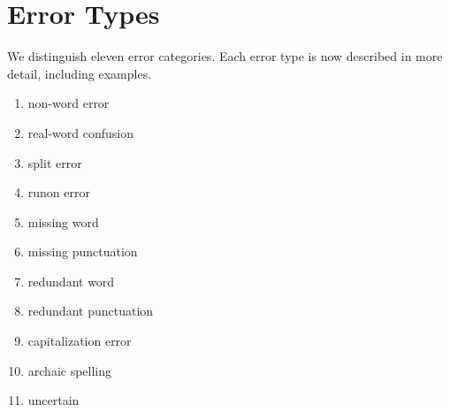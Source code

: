 \documentclass[a4paper,11pt]{article}
\begin{document}


\section{Error Types}

We distinguish eleven error categories. Each error type is now described in more detail, including examples.

\begin{enumerate}
  \item non-word error
  \item real-word confusion
  \item split error
  \item runon error
  \item missing word
  \item missing punctuation
  \item redundant word
  \item redundant punctuation
  \item capitalization error
  \item archaic spelling
  \item uncertain
\end{enumerate}
\end{document}
